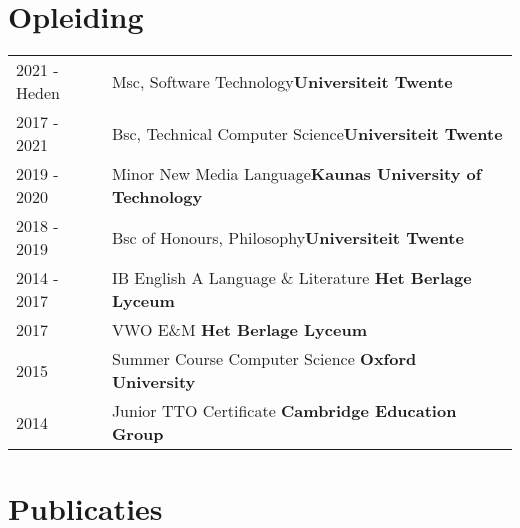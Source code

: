 \documentclass[a4paper,12pt]{article}
\begin{document}
\section{Opleiding}
\begin{tabularx}{\linewidth}{@{}l X@{}}	
2021 - Heden & Msc, Software Technology\hfill \textbf{Universiteit Twente} \\

2017 - 2021 & Bsc, Technical Computer Science\hfill \textbf{Universiteit Twente} \\ 

2019 - 2020 & Minor New Media Language\hfill \textbf{Kaunas University of Technology} \\

2018 - 2019 & Bsc of Honours, Philosophy\hfill \textbf{Universiteit Twente} \\

2014 - 2017 & IB English A Language \& Literature \hfill \textbf{Het Berlage Lyceum} \\

2017 & VWO E\&M \hfill \textbf{Het Berlage Lyceum} \\

2015 & Summer Course Computer Science \hfill \textbf{Oxford University} \\

2014 & Junior TTO Certificate \hfill \textbf{Cambridge Education Group} \\
\end{tabularx}

\section{Publicaties}
\begin{refsection}
\printbibliography[heading=none]
\nocite{*}
\end{refsection}

\end{document}

